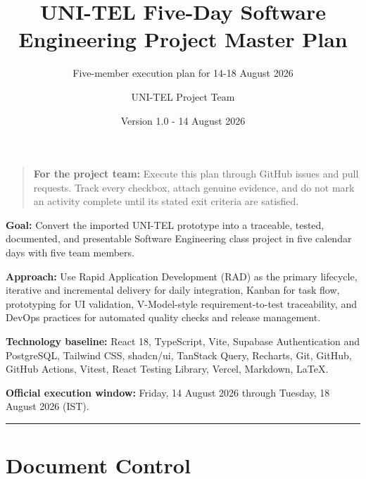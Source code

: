 \documentclass[
  10pt,
  a4paper,
  oneside]{report}
\title{UNI-TEL Five-Day Software Engineering Project Master Plan}
\subtitle{Five-member execution plan for 14-18 August 2026}
\author{UNI-TEL Project Team}
\date{Version 1.0 - 14 August 2026}
\begin{document}
\maketitle

{
\setcounter{tocdepth}{1}
\tableofcontents
}
\begin{quote}
\textbf{For the project team:} Execute this plan through GitHub issues
and pull requests. Track every checkbox, attach genuine evidence, and do
not mark an activity complete until its stated exit criteria are
satisfied.
\end{quote}

\textbf{Goal:} Convert the imported UNI-TEL prototype into a traceable,
tested, documented, and presentable Software Engineering class project
in five calendar days with five team members.

\textbf{Approach:} Use Rapid Application Development (RAD) as the
primary lifecycle, iterative and incremental delivery for daily
integration, Kanban for task flow, prototyping for UI validation,
V-Model-style requirement-to-test traceability, and DevOps practices for
automated quality checks and release management.

\textbf{Technology baseline:} React 18, TypeScript, Vite, Supabase
Authentication and PostgreSQL, Tailwind CSS, shadcn/ui, TanStack Query,
Recharts, Git, GitHub, GitHub Actions, Vitest, React Testing Library,
Vercel, Markdown, LaTeX.

\textbf{Official execution window:} Friday, 14 August 2026 through
Tuesday, 18 August 2026 (IST).

\begin{center}\rule{0.5\linewidth}{0.5pt}\end{center}

\chapter{Document Control}\label{1-document-control}
\end{document}
